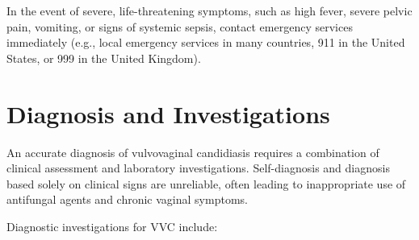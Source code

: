 In the event of severe, life-threatening symptoms, such as high fever, severe pelvic pain, vomiting, or signs of systemic sepsis, contact emergency services immediately (e.g., local emergency services in many countries, 911 in the United States, or 999 in the United Kingdom).

\section*{Diagnosis and Investigations}
An accurate diagnosis of vulvovaginal candidiasis requires a combination of clinical assessment and laboratory investigations. Self-diagnosis and diagnosis based solely on clinical signs are unreliable, often leading to inappropriate use of antifungal agents and chronic vaginal symptoms.

Diagnostic investigations for VVC include:
